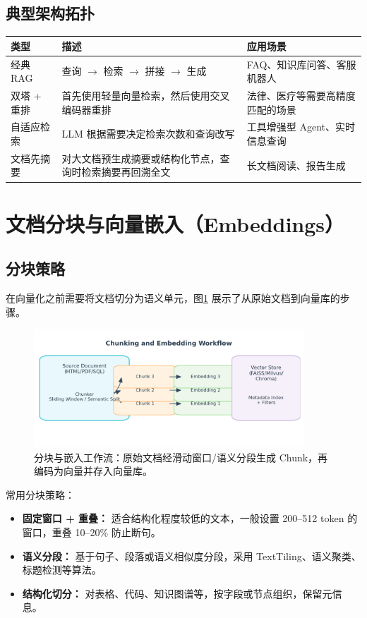 \documentclass[UTF8,zihao=-4]{ctexart}
\begin{document}
\subsection{典型架构拓扑}
\begin{longtable}{p{3cm}p{5cm}p{6cm}}
\toprule
类型 & 描述 & 应用场景 \\
\midrule
经典 RAG & 查询 $\rightarrow$ 检索 $\rightarrow$ 拼接 $\rightarrow$ 生成 & FAQ、知识库问答、客服机器人 \\
双塔 + 重排 & 首先使用轻量向量检索，然后使用交叉编码器重排 & 法律、医疗等需要高精度匹配的场景 \\
自适应检索 & LLM 根据需要决定检索次数和查询改写 & 工具增强型 Agent、实时信息查询 \\
文档先摘要 & 对大文档预生成摘要或结构化节点，查询时检索摘要再回溯全文 & 长文档阅读、报告生成 \\
\bottomrule
\end{longtable}

\section{文档分块与向量嵌入（Embeddings）}
\subsection{分块策略}
在向量化之前需要将文档切分为语义单元，图\ref{fig:chunk_flow_cn} 展示了从原始文档到向量库的步骤。
\begin{figure}[H]
  \centering
  \includegraphics[width=0.9\textwidth]{chunk_embedding.png}
  \caption{分块与嵌入工作流：原始文档经滑动窗口/语义分段生成 Chunk，再编码为向量并存入向量库。}
  \label{fig:chunk_flow_cn}
\end{figure}
常用分块策略：
\begin{itemize}
  \item \textbf{固定窗口 + 重叠：} 适合结构化程度较低的文本，一般设置 200--512 token 的窗口，重叠 10--20\% 防止断句。
  \item \textbf{语义分段：} 基于句子、段落或语义相似度分段，采用 TextTiling、语义聚类、标题检测等算法。
  \item \textbf{结构化切分：} 对表格、代码、知识图谱等，按字段或节点组织，保留元信息。
\end{itemize}
\end{document}

